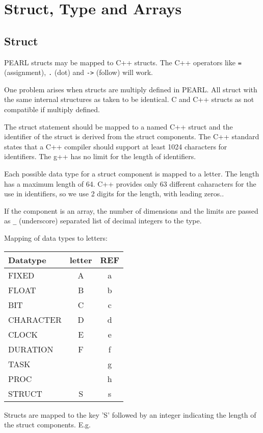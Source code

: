 \chapter{Struct, Type and Arrays}

\section{Struct}

PEARL structs may be mapped to C++ structs.
The C++ operators like \verb|=| (assignment), \verb|.| (dot) and 
\verb|->| (follow) will work.

One problem arises when structs are multiply defined
in PEARL. All struct with the same internal structures as
taken to be identical. C and C++ structs as not compatible
if multiply defined.

The struct statement should be mapped to a named C++ struct and the identifier
of the struct is derived from the struct components.
The C++ standard states that a C++ compiler should support at least 1024
characters for identifiers. The g++ has no limit for the length of identifiers.

Each possible data type for a struct component is mapped to a letter.
The length has a maximum length of 64. C++ provides only 63 different
 caharacters for the use in identifiers, so we use 2 digits
for the length, with leading zeros..

If the component is an array, the number of dimensions and the
 limits are
passed as \verb|_| (underscore) separated list of decimal integers
to the type.

Mapping of data types to letters:

\begin{tabular}{|l|c|c|}
\hline
Datatype & letter & REF \\
\hline
FIXED & A &a\\
FLOAT & B &b\\
BIT  & C &c\\
CHARACTER & D &d \\
CLOCK  & E &e \\
DURATION & F&f \\
TASK & & g \\
PROC  & & h \\
\hline
STRUCT & S &s\\
\hline
\end{tabular}

Structs are mapped to the key 'S' followed by an integer
indicating the length of the struct components.
E.g. 

